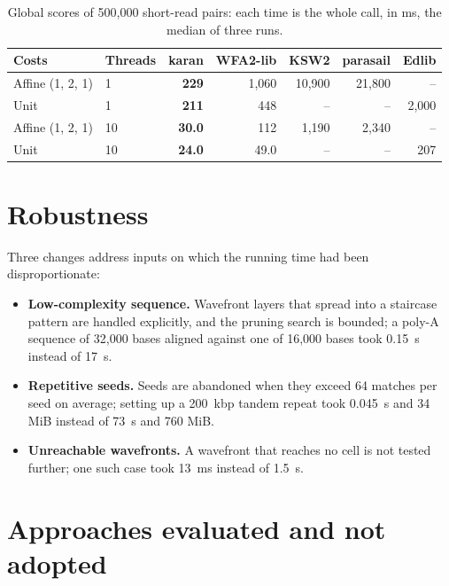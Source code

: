 \documentclass[10pt]{article}
\begin{document}
\begin{table}[t]
\caption{Global scores of 500{,}000 short-read pairs: each time is the whole call, in ms, the median of three runs.}\label{tab:batch}
\centering\footnotesize
\setlength{\tabcolsep}{4pt}
\begin{tabular}{@{}llrrrrr@{}}
\toprule
Costs & Threads & karan & WFA2-lib & KSW2 & parasail & Edlib \\
\midrule
Affine (1, 2, 1) & 1 & \textbf{229} & 1{,}060 & 10{,}900 & 21{,}800 & – \\
Unit & 1 & \textbf{211} & 448 & – & – & 2{,}000 \\
Affine (1, 2, 1) & 10 & \textbf{30.0} & 112 & 1{,}190 & 2{,}340 & – \\
Unit & 10 & \textbf{24.0} & 49.0 & – & – & 207 \\
\bottomrule
\end{tabular}
\end{table}

\section{Robustness}

Three changes address inputs on which the running time had been disproportionate:

\begin{itemize}
  \item \textbf{Low-complexity sequence.} Wavefront layers that spread into a staircase pattern are handled explicitly, and the pruning search is bounded; a poly-A sequence of 32{,}000 bases aligned against one of 16{,}000 bases took 0.15~s instead of 17~s.
  \item \textbf{Repetitive seeds.} Seeds are abandoned when they exceed 64 matches per seed on average; setting up a 200~kbp tandem repeat took 0.045~s and 34 MiB instead of 73~s and 760 MiB.
  \item \textbf{Unreachable wavefronts.} A wavefront that reaches no cell is not tested further; one such case took 13~ms instead of 1.5~s.
\end{itemize}

\section{Approaches evaluated and not adopted}
\end{document}
